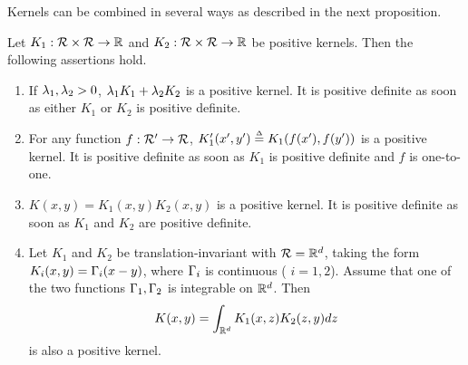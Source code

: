 Kernels can be combined in several ways as described in the next proposition. 
\begin{proposition}
\label{prop:combine.K}
Let  $K_1: {\mathcal R}\times{\mathcal R} \to {\mathbb{R}}$ and $K_2: {\mathcal R}\times{\mathcal R} \to {\mathbb{R}}$ be positive kernels. Then the following assertions hold.
\begin{enumerate}[label=(\roman*),leftmargin=1cm]
\item  If  $\lambda_1, \lambda_2 >0$, $\lambda_1K_1+\lambda_2 K_2$ is a positive kernel. It is positive definite as soon as either $K_1$ or $K_2$ is positive definite.
\item For any function $f: {\mathcal R}' \to {\mathcal R}$, $K'_1(x',y') \stackrel{{\scriptscriptstyle \Delta}}{=} K_1(f(x'), f(y'))$ is a positive kernel. It is positive definite as soon as $K_1$ is positive definite and $f$ is one-to-one.
\item $K(x,y) = K_1(x,y)K_2(x,y)$ is a positive kernel. It is positive definite as soon as $K_1$ and $K_2$ are positive definite.
\item Let $K_1$ and $K_2$ be translation-invariant with ${\mathcal R} = {\mathbb{R}}^d$, taking the form $K_i(x,y) = \Gamma_i(x-y)$, where $\Gamma_i$ is continuous  ( $i=1,2$). Assume that one of the two functions $\Gamma_1, \Gamma_2$ is integrable on ${\mathbb{R}}^d$. Then
\[
K(x,y) = \int_{{\mathbb{R}}^d} K_1(x, z) K_2(z,y) dz 
\]
is also a positive kernel.
\end{enumerate}
\end{proposition}
